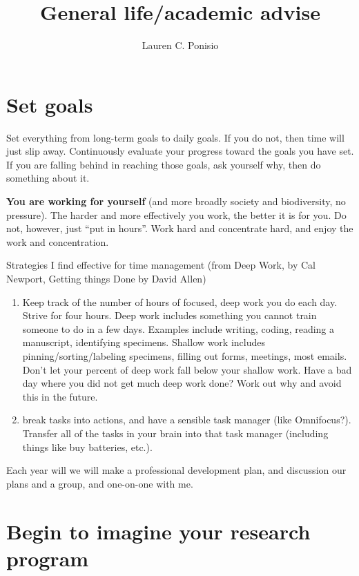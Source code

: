 \documentclass[12pt]{article}
\begin{document}
\title{General life/academic advise}
\author{Lauren C. Ponisio}

\maketitle

\section{Set goals}
\label{sec:goals}
Set everything from long-term goals to daily goals. If you do not,
then time will just slip away. Continuously evaluate your progress
toward the goals you have set. If you are falling behind in reaching
those goals, ask yourself why, then do something about it.

\textbf{You are working for yourself} (and more broadly society and
biodiversity, no pressure). The harder and more effectively you work,
the better it is for you. Do not, however, just ``put in hours''. Work
hard and concentrate hard, and enjoy the work and concentration.

Strategies I find effective for time management (from Deep Work, by
Cal Newport, Getting things Done by David Allen)
\begin{enumerate}
\item Keep track of the number of hours of focused, deep work you do
  each day. Strive for four hours. Deep work includes something you
  cannot train someone to do in a few days. Examples include writing,
  coding, reading a manuscript, identifying specimens. Shallow work
  includes pinning/sorting/labeling specimens, filling out forms,
  meetings, most emails. Don't let your percent of deep work fall
  below your shallow work. Have a bad day where you did not get much
  deep work done? Work out why and avoid this in the future.
\item break tasks into actions, and have a sensible task manager (like
  Omnifocus?). Transfer all of the tasks in your brain into that task
  manager (including things like buy batteries, etc.).
\end{enumerate}

Each year will we will make a professional development plan, and
discussion our plans and a group, and one-on-one with me.

\section{Begin to imagine your research program}
\label{sec:research}
\end{document}
